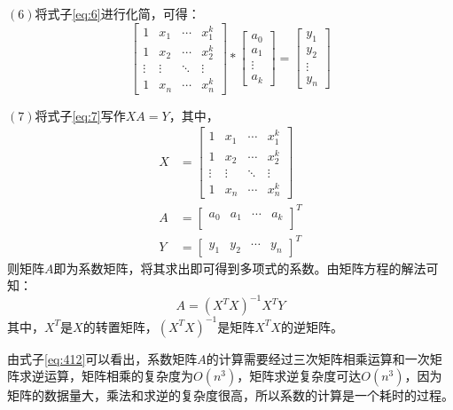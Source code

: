 $(6)$将式子\ref{eq:6}进行化简，可得：
\begin{equation}\label{eq:7}
\begin{bmatrix}
1& x_1 & \cdots &  x_1^k \\
1& x_2 & \cdots &  x_2^k \\
\vdots & \vdots & \ddots & \vdots \\
1& x_n & \cdots &  x_n^k
\end{bmatrix}*
\begin{bmatrix}
a_0 \\
a_1 \\
\vdots \\
a_k
\end{bmatrix}
=
\begin{bmatrix}
y_1 \\
y_2 \\
\vdots \\
y_n
\end{bmatrix}
\end{equation}

$(7)$将式子\ref{eq:7}写作$XA=Y$，其中，
\begin{equation}\label{eq:411}
\begin{split}
X &= \begin{bmatrix}
1& x_1 & \cdots &  x_1^k \\
1& x_2 & \cdots &  x_2^k \\
\vdots & \vdots & \ddots & \vdots \\
1& x_n & \cdots &  x_n^k
\end{bmatrix} \\
A &= \begin{bmatrix}
a_0 & a_1 & \cdots & a_k \\
\end{bmatrix}^T  \\
Y &= \begin{bmatrix}
y_1 & y_2 & \cdots & y_n
\end{bmatrix}^T
\end{split}
\end{equation}
则矩阵$A$即为系数矩阵，将其求出即可得到多项式的系数。由矩阵方程的解法可知：
\begin{equation}\label{eq:412}
A=(X^TX)^{-1}X^TY
\end{equation}
其中，$X^T$是$X$的转置矩阵，$(X^TX)^{-1}$是矩阵$X^TX$的逆矩阵。

由式子\ref{eq:412}可以看出，系数矩阵$A$的计算需要经过三次矩阵相乘运算和一次矩阵求逆运算，矩阵相乘的复杂度为$O(n^3)$，矩阵求逆复杂度可达$O(n^3)$，因为矩阵的数据量大，乘法和求逆的复杂度很高，所以系数的计算是一个耗时的过程。

